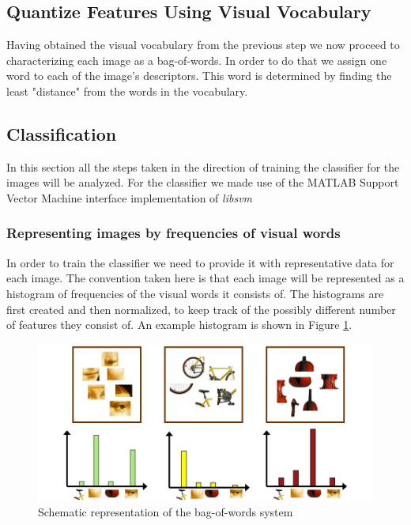 \documentclass[11pt]{article}
\begin{document}
\subsection{Quantize Features Using Visual Vocabulary}
Having obtained the visual vocabulary from the previous step we now proceed to characterizing each image as a bag-of-words. In order to do that we assign one word to each of the image's descriptors. This word is determined by finding the least "distance" from the words in the vocabulary.

\subsection{Classification}
In this section all the steps taken in the direction of training the classifier for the images will be analyzed. For the classifier we made use of the MATLAB Support Vector Machine interface implementation of \emph{libsvm}\cite{CC01a}

\subsubsection{Representing images by frequencies of visual words}
In order to train the classifier we need to provide it with representative data for each image. The convention taken here is that each image will be represented as a histogram of frequencies of the visual words it consists of. The histograms are first created and then normalized, to keep track of the possibly different number of features they consist of. An example histogram is shown in Figure \ref{wordhistogram}.

\begin{figure}[h!]
\centering
\includegraphics[scale=0.30]{wordhistogram.jpg}
\caption{Schematic representation of the bag-of-words system}
\label{wordhistogram}
\end{figure}
\end{document}
